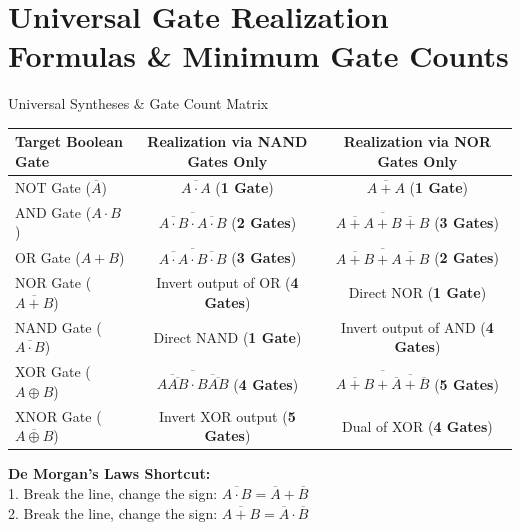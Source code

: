 \section{Universal Gate Realization Formulas \& Minimum Gate Counts}
\begin{formulabox}{Universal Syntheses \& Gate Count Matrix}
\begin{center}
\begin{tabular}{lcc}
\toprule
\textbf{Target Boolean Gate} & \textbf{Realization via NAND Gates Only} & \textbf{Realization via NOR Gates Only} \\
\midrule
NOT Gate ($\overline{A}$) & $\overline{A \cdot A}$ (\textbf{1 Gate}) & $\overline{A + A}$ (\textbf{1 Gate}) \\
AND Gate ($A \cdot B$) & $\overline{\overline{A \cdot B} \cdot \overline{A \cdot B}}$ (\textbf{2 Gates}) & $\overline{\overline{A + A} + \overline{B + B}}$ (\textbf{3 Gates}) \\
OR Gate ($A + B$) & $\overline{\overline{A \cdot A} \cdot \overline{B \cdot B}}$ (\textbf{3 Gates}) & $\overline{\overline{A + B} + \overline{A + B}}$ (\textbf{2 Gates}) \\
NOR Gate ($\overline{A + B}$) & Invert output of OR (\textbf{4 Gates}) & Direct NOR (\textbf{1 Gate}) \\
NAND Gate ($\overline{A \cdot B}$) & Direct NAND (\textbf{1 Gate}) & Invert output of AND (\textbf{4 Gates}) \\
XOR Gate ($A \oplus B$) & $\overline{\overline{A\overline{AB}} \cdot \overline{B\overline{AB}}}$ (\textbf{4 Gates}) & $\overline{\overline{A+B} + \overline{\overline{A}+\overline{B}}}$ (\textbf{5 Gates}) \\
XNOR Gate ($\overline{A \oplus B}$) & Invert XOR output (\textbf{5 Gates}) & Dual of XOR (\textbf{4 Gates}) \\
\bottomrule
\end{tabular}
\end{center}
\end{formulabox}

\begin{memorytip}
\textbf{De Morgan's Laws Shortcut:}\\
1. Break the line, change the sign: $\overline{A \cdot B} = \overline{A} + \overline{B}$\\
2. Break the line, change the sign: $\overline{A + B} = \overline{A} \cdot \overline{B}$
\end{memorytip}
